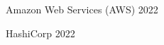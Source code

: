 

\begin{cvhonours}

	{Amazon Web Services (AWS)} %
	{} %
	{2022} %

	{HashiCorp} %
	{} %
	{2022} %

\end{cvhonours}
